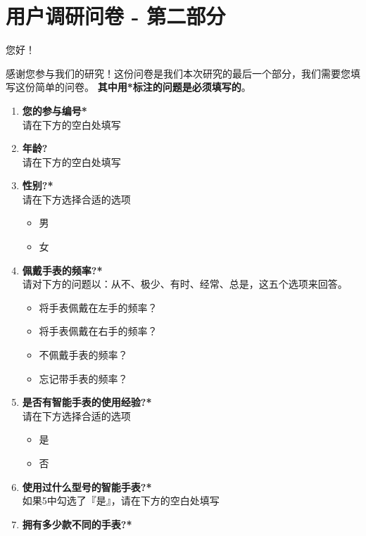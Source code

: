 

  \cleardoublepage


  \chapter{\heiti 用户调研问卷 - 第二部分}
  \label{appendix:c}
  您好！

  感谢您参与我们的研究！这份问卷是我们本次研究的最后一个部分，我们需要您填写这份简单的问卷。
  \textbf{其中用*标注的问题是必须填写的}。

  \begin{enumerate}
      \kaishu
      \item \textbf{您的参与编号*}\\
      请在下方的空白处填写
      \item \textbf{年龄?}\\
      请在下方的空白处填写
      \item \textbf{性别?*}\\
      请在下方选择合适的选项
      \begin{itemize}
          \item 男
          \item 女
      \end{itemize}
      \item \textbf{佩戴手表的频率?*}\\
      请对下方的问题以：从不、极少、有时、经常、总是，这五个选项来回答。
      \begin{itemize}
          \item 将手表佩戴在左手的频率？
          \item 将手表佩戴在右手的频率？
          \item 不佩戴手表的频率？
          \item 忘记带手表的频率？
      \end{itemize}
      \item \textbf{是否有智能手表的使用经验?*}\\
      请在下方选择合适的选项
      \begin{itemize}
          \item 是
          \item 否
      \end{itemize}
      \item \textbf{使用过什么型号的智能手表?*}\\
      如果5中勾选了『是』，请在下方的空白处填写
      \item \textbf{拥有多少款不同的手表?*}\\

\end{enumerate}
